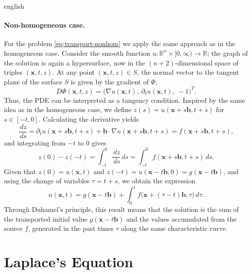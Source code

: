 \documentclass[0000.tex]{subfiles}
\begin{document}
\begin{hyphenrules}{english}
\paragraph{Non-homogeneous case.}
For the problem \eqref{eq:transport-nonhom} we apply the same approach as in the homogeneous case.
Consider the smooth function
$u:\mathbb{R}^n\times[0,\infty)\to\mathbb{R}$; the graph of the solution is again a hypersurface, now in the
$(n+2)$-dimensional space of triples $(\mathbf{x},t,z)$. At any point $(\mathbf{x},t,z)\in S$, the normal vector to
the tangent plane of the surface $S$ is given by the gradient of $\Phi$,
\begin{equation}
  D\Phi(\mathbf{x},t,z)=\big(\nabla u(\mathbf{x},t),\ \partial_t u(\mathbf{x},t),\ -1\big)^{T}.
  \label{eq:transport-normal}
\end{equation}
Thus, the PDE can be interpreted as a tangency condition. Inspired by the same idea as in the
homogeneous case, we define $z(s)=u(\mathbf{x}+s\mathbf{b},t+s)$ for $s\in[-t,0]$. Calculating the derivative yields
\begin{equation}
  \frac{\,d z}{\,d s}=\partial_t u(\mathbf{x}+s\mathbf{b},t+s)+\mathbf{b}\cdot\nabla u(\mathbf{x}+s\mathbf{b},t+s)=f(\mathbf{x}+s\mathbf{b},t+s),
  \label{eq:transport-dz}
\end{equation}
and integrating from $-t$ to $0$ gives
\begin{equation}
  z(0)-z(-t)=\int_{-t}^{0}\frac{\,d z}{\,d s}\,d s=\int_{-t}^{0}f(\mathbf{x}+s\mathbf{b},t+s)\,d s.
  \label{eq:transport-int}
\end{equation}
Given that $z(0)=u(\mathbf{x},t)$ and $z(-t)=u(\mathbf{x}-t\mathbf{b},0)=g(\mathbf{x}-t\mathbf{b})$, and using the change of variables
$\tau=t+s$, we obtain the expression
\begin{equation}
  u(\mathbf{x},t)=g(\mathbf{x}-t\mathbf{b})+\int_{0}^{t}f\big(\mathbf{x}+(\tau-t)\mathbf{b},\tau\big)\,d\tau.
  \label{eq:app-transport-duhamel}
\end{equation}
Through Duhamel's principle, this result means that the solution is the sum of the transported initial
value $g(\mathbf{x}-t\mathbf{b})$ and the values accumulated from the source $f$, generated in the past times $\tau$
along the same characteristic curve.

\section{Laplace's Equation}\label{app-sec:laplace}


\end{hyphenrules}
\end{document}

